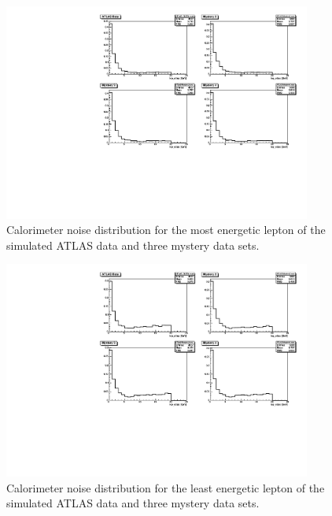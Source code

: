 \documentclass[twoside,        %
               BCOR12mm,       %
               ngerman,english, %
               fleqn,headsepline=false,footsepline=false
              ]{Vorlage/MFPREPORT}
\begin{document}
\begin{figure}[h!]
    \begin{center}
        \includegraphics[width=0.9\textwidth]{ZZ/mystery_et_iso_1_uncut.pdf}
    \end{center}
    \caption{Calorimeter noise distribution for the most energetic lepton of the simulated ATLAS data and three mystery data sets.}
    \label{fig:myst2}
\end{figure}


\begin{figure}[h!]
    \begin{center}
        \includegraphics[width=0.9\textwidth]{ZZ/mystery_et_iso_4_uncut.pdf}
    \end{center}
    \caption{Calorimeter noise distribution for the least energetic lepton of the simulated ATLAS data and three mystery data sets.}
    \label{fig:myst3}
\end{figure}
\end{document}
